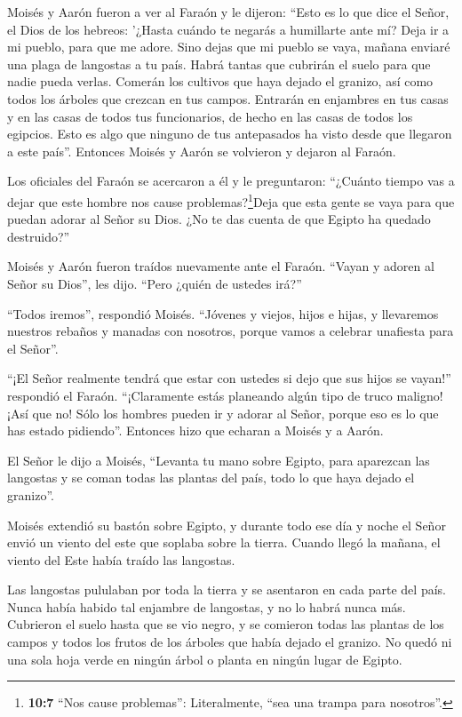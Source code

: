  Moisés y Aarón fueron a ver al Faraón y le dijeron: ``Esto
es lo que dice el Señor, el Dios de los hebreos: '¿Hasta cuándo te
negarás a humillarte ante mí? Deja ir a mi pueblo, para que me adore.
 Sino dejas que mi pueblo se vaya, mañana enviaré una plaga
de langostas a tu país.  Habrá tantas que cubrirán el suelo
para que nadie pueda verlas. Comerán los cultivos que haya dejado el
granizo, así como todos los árboles que crezcan en tus campos.
 Entrarán en enjambres en tus casas y en las casas de todos
tus funcionarios, de hecho en las casas de todos los egipcios. Esto es
algo que ninguno de tus antepasados ha visto desde que llegaron a este
país''. Entonces Moisés y Aarón se volvieron y dejaron al Faraón.

 Los oficiales del Faraón se acercaron a él y le
preguntaron: ``¿Cuánto tiempo vas a dejar que este hombre nos cause
problemas?\footnote{\textbf{10:7} ``Nos cause problemas'': Literalmente,
  ``sea una trampa para nosotros''.}Deja que esta gente se vaya para que
puedan adorar al Señor su Dios. ¿No te das cuenta de que Egipto ha
quedado destruido?''

 Moisés y Aarón fueron traídos nuevamente ante el Faraón.
``Vayan y adoren al Señor su Dios'', les dijo. ``Pero ¿quién de ustedes
irá?''

 ``Todos iremos'', respondió Moisés. ``Jóvenes y viejos,
hijos e hijas, y llevaremos nuestros rebaños y manadas con nosotros,
porque vamos a celebrar unafiesta para el Señor''.

 ``¡El Señor realmente tendrá que estar con ustedes si dejo
que sus hijos se vayan!'' respondió el Faraón. ``¡Claramente estás
planeando algún tipo de truco maligno!  ¡Así que no! Sólo
los hombres pueden ir y adorar al Señor, porque eso es lo que has estado
pidiendo''. Entonces hizo que echaran a Moisés y a Aarón.

 El Señor le dijo a Moisés, ``Levanta tu mano sobre Egipto,
para aparezcan las langostas y se coman todas las plantas del país, todo
lo que haya dejado el granizo''.

 Moisés extendió su bastón sobre Egipto, y durante todo ese
día y noche el Señor envió un viento del este que soplaba sobre la
tierra. Cuando llegó la mañana, el viento del Este había traído las
langostas.

 Las langostas pululaban por toda la tierra y se asentaron
en cada parte del país. Nunca había habido tal enjambre de langostas, y
no lo habrá nunca más.  Cubrieron el suelo hasta que se vio
negro, y se comieron todas las plantas de los campos y todos los frutos
de los árboles que había dejado el granizo. No quedó ni una sola hoja
verde en ningún árbol o planta en ningún lugar de Egipto.

